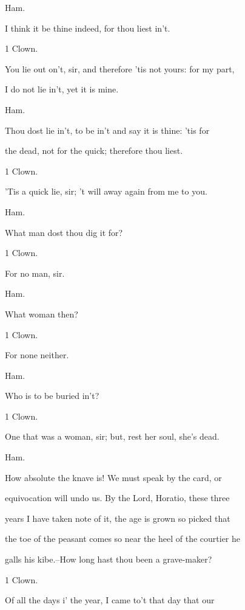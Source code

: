 \documentclass[12pt]{book}
\begin{document}
Ham.

I think it be thine indeed, for thou liest in't.



1 Clown.

You lie out on't, sir, and therefore 'tis not yours: for my part,

I do not lie in't, yet it is mine.



Ham.

Thou dost lie in't, to be in't and say it is thine: 'tis for

the dead, not for the quick; therefore thou liest.



1 Clown.

'Tis a quick lie, sir; 't will away again from me to you.



Ham.

What man dost thou dig it for?



1 Clown. 

For no man, sir.



Ham.

What woman then?



1 Clown.

For none neither.



Ham.

Who is to be buried in't?



1 Clown.

One that was a woman, sir; but, rest her soul, she's dead.



Ham.

How absolute the knave is! We must speak by the card, or

equivocation will undo us. By the Lord, Horatio, these three

years I have taken note of it, the age is grown so picked that

the toe of the peasant comes so near the heel of the courtier he

galls his kibe.--How long hast thou been a grave-maker?



1 Clown.

Of all the days i' the year, I came to't that day that our
\end{document}
